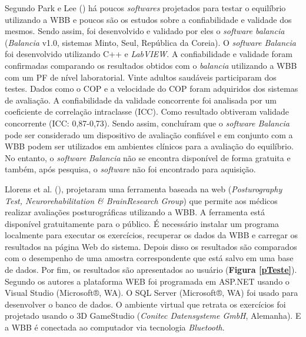Segundo Park e Lee (\citeyear{park2014validity}) há poucos \textit{softwares} projetados para testar o equilíbrio utilizando a WBB e poucos são os estudos sobre a confiabilidade e validade dos mesmos. Sendo assim, foi desenvolvido e validado por eles o \textit{software balancia} (\textit{Balancia} v1.0, sistemas Minto, Seul, República da Coreia). O \textit{software Balancia} foi desenvolvido utilizando C++ e \textit{LabVIEW}. A confiabilidade e validade foram confirmadas comparando os resultados obtidos com o \textit{balancia} utilizando a WBB com um PF de nível laboratorial. Vinte adultos saudáveis participaram dos testes. Dados como o COP e a velocidade do COP foram adquiridos dos sistemas de avaliação. A confiabilidade da validade concorrente foi analisada por um coeficiente de correlação intraclasse (ICC). Como resultado obtiveram validade concorrente (ICC: 0,87-0,73). Sendo assim, concluíram que o \textit{software Balancia} pode ser considerado um dispositivo de avaliação confiável e em conjunto com a WBB podem ser utilizados em ambientes clínicos para a avaliação do equilíbrio. No entanto, o \textit{software} \textit{Balancia} não se encontra disponível de forma gratuita e também, após pesquisa, o \textit{software} não foi encontrado para aquisição.

Llorens et al. (\citeyear{llorens2015low}), projetaram uma ferramenta  baseada na web (\textit{Posturography Test,  Neurorehabilitation & BrainResearch Group}) que permite aos médicos realizar avaliações posturográficas utilizando a WBB. A ferramenta está disponível gratuitamente para o público. É necessário instalar um programa localmente para executar os exercícios, recuperar os dados da WBB e carregar os resultados na página Web do sistema. Depois disso os resultados são comparados com o desempenho de uma amostra correspondente que está salvo em uma base de dados. Por fim, os resultados são apresentados ao usuário (\textbf{Figura \ref{pTeste}}). Segundo os autores a plataforma WEB foi programada em ASP.NET usando o Visual Studio (Microsoft®, WA). O SQL Server (Microsoft®, WA) foi usado para desenvolver o banco de dados. O ambiente virtual que retrata os exercícios foi projetado usando o 3D GameStudio (\textit{Conitec Datensysteme GmbH}, Alemanha). E a WBB é conectada ao computador via tecnologia \textit{Bluetooth}.

